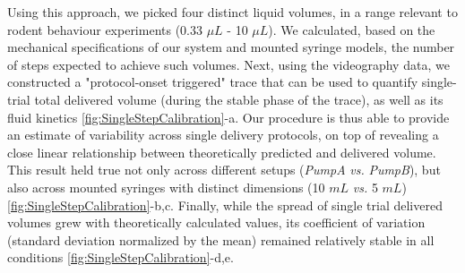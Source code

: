 Using this approach, we picked four distinct liquid volumes, in a range relevant to rodent behaviour experiments (0.33 $\mu L$ - 10 $\mu L$). We calculated, based on the mechanical specifications of our system and mounted syringe models, the number of steps expected to achieve such volumes. Next, using the videography data, we constructed a "protocol-onset triggered" trace that can be used to quantify single-trial total delivered volume (during the stable phase of the trace), as well as its fluid kinetics \ref{fig:SingleStepCalibration}-a. Our procedure is thus able to provide an estimate of variability across single delivery protocols, on top of revealing a close linear relationship between theoretically predicted and delivered volume. This result held true not only across different setups (\textit{PumpA} \textit{vs.} \textit{PumpB}), but also across mounted syringes with distinct dimensions (10 $mL$ \textit{vs.} 5 $mL$) \ref{fig:SingleStepCalibration}-b,c. Finally, while the spread of single trial delivered volumes grew with theoretically calculated values, its coefficient of variation (standard deviation normalized by the mean) remained relatively stable in all conditions \ref{fig:SingleStepCalibration}-d,e.


